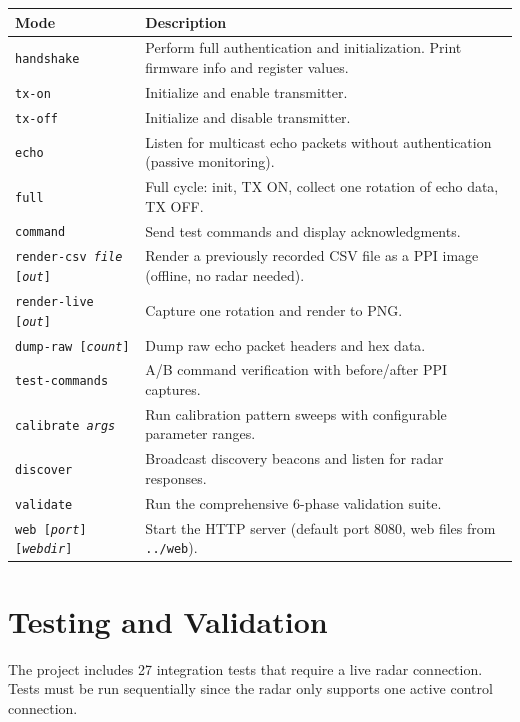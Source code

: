 \documentclass[11pt,letterpaper]{article}
\begin{document}
\begin{longtable}{@{}lp{9cm}@{}}
\toprule
\textbf{Mode} & \textbf{Description} \\
\midrule
\endhead
\texttt{handshake} & Perform full authentication and initialization. Print firmware info and register values. \\
\texttt{tx-on} & Initialize and enable transmitter. \\
\texttt{tx-off} & Initialize and disable transmitter. \\
\texttt{echo} & Listen for multicast echo packets without authentication (passive monitoring). \\
\texttt{full} & Full cycle: init, TX ON, collect one rotation of echo data, TX OFF. \\
\texttt{command} & Send test commands and display acknowledgments. \\
\texttt{render-csv \textit{file} [\textit{out}]} & Render a previously recorded CSV file as a PPI image (offline, no radar needed). \\
\texttt{render-live [\textit{out}]} & Capture one rotation and render to PNG. \\
\texttt{dump-raw [\textit{count}]} & Dump raw echo packet headers and hex data. \\
\texttt{test-commands} & A/B command verification with before/after PPI captures. \\
\texttt{calibrate \textit{args}} & Run calibration pattern sweeps with configurable parameter ranges. \\
\texttt{discover} & Broadcast discovery beacons and listen for radar responses. \\
\texttt{validate} & Run the comprehensive 6-phase validation suite. \\
\texttt{web [\textit{port}] [\textit{webdir}]} & Start the HTTP server (default port 8080, web files from \texttt{../web}). \\
\bottomrule
\end{longtable}


\section{Testing and Validation}

The project includes 27 integration tests that require a live radar connection. Tests must be run sequentially since the radar only supports one active control connection.
\end{document}
